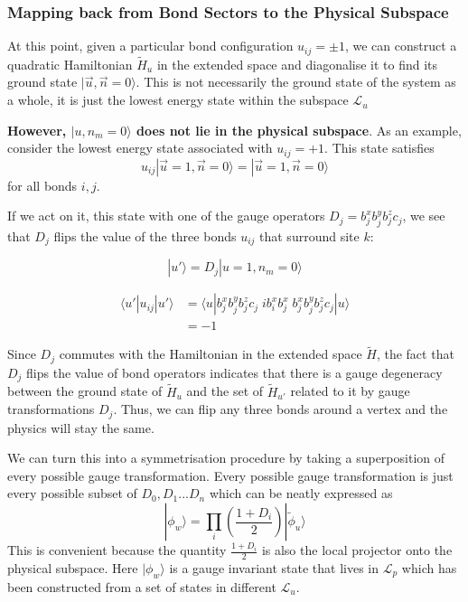 \hypertarget{mapping-back-from-bond-sectors-to-the-physical-subspace}{%
\subsubsection{Mapping back from Bond Sectors to the Physical Subspace}\label{mapping-back-from-bond-sectors-to-the-physical-subspace}}

At this point, given a particular bond configuration \(u_{ij} = \pm 1\), we can construct a quadratic Hamiltonian \(\tilde{H}_u\) in the extended space and diagonalise it to find its ground state \(|\vec{u}, \vec{n} = 0\rangle\). This is not necessarily the ground state of the system as a whole, it is just the lowest energy state within the subspace \(\mathcal{L}_u\)

\textbf{However, \(|u, n_m = 0\rangle\) does not lie in the physical subspace}. As an example, consider the lowest energy state associated with \(u_{ij} = +1\). This state satisfies \[u_{ij} |\vec{u}=1, \vec{n} = 0\rangle = |\vec{u}=1, \vec{n} = 0\rangle\] for all bonds \(i,j\).

If we act on it, this state with one of the gauge operators \(D_j = b_j^x b_j^y b_j^z c_j\), we see that \(D_j\) flips the value of the three bonds \(u_{ij}\) that surround site \(k\):

\[ |u'\rangle = D_j |u=1, n_m = 0\rangle\]

\[ \begin{aligned}
\langle u'|u_{ij}|u'\rangle &=  \langle u| b_j^x b_j^y b_j^z c_j \;ib^x_i b^x_j\; b_j^x b_j^y b_j^z c_j|u\rangle\\
&= -1
\end{aligned}\]

Since \(D_j\) commutes with the Hamiltonian in the extended space \(\tilde{H}\), the fact that \(D_j\) flips the value of bond operators indicates that there is a gauge degeneracy between the ground state of \(\tilde{H}_u\) and the set of \(\tilde{H}_{u'}\) related to it by gauge transformations \(D_j\). Thus, we can flip any three bonds around a vertex and the physics will stay the same.

We can turn this into a symmetrisation procedure by taking a superposition of every possible gauge transformation. Every possible gauge transformation is just every possible subset of \({D_0, D_1 ... D_n}\) which can be neatly expressed as \[|\phi_w\rangle = \prod_i \left( \frac{1 + D_i}{2}\right) |\tilde{\phi}_u\rangle\] This is convenient because the quantity \(\frac{1 + D_i}{2}\) is also the local projector onto the physical subspace. Here \(|\phi_w\rangle\) is a gauge invariant state that lives in \(\mathcal{L}_p\) which has been constructed from a set of states in different \(\mathcal{L}_u\).

